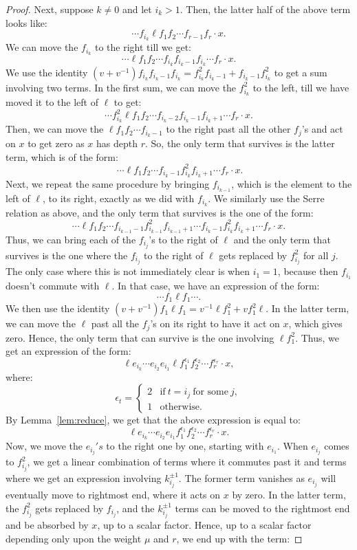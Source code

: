 \documentclass{amsart}
\numberwithin{equation}{section}
\theoremstyle{theorem}
\theoremstyle{definition}
\newcommand{\eps}{\epsilon}
\begin{document}
\begin{proof}
Next, suppose $k\neq 0$ and let $i_k>1$. Then, the latter half of the above term looks like:
\[\cdots f_{i_k} \ell  f_1 f_2\cdots f_{r-1} f_{r} \cdot x.\]
We can move the $f_{i_k}$ to the right till we get:
\[\cdots \ell  f_1 f_2\cdots f_{i_k}  f_{i_{k}-1}  f_{i_k} \cdots f_{r} \cdot x.\]
We use the identity $(v+v^{-1})f_{i_k}  f_{i_{k}-1}  f_{i_k} =f_{i_k}^2  f_{i_k - 1} + f_{i_k -1} f_{i_k}^2$ to get a sum involving two terms. In the first sum, we can move the $f_{i_k}^2$ to the left, till we have moved it to the left of $\ell$ to get:
\[\cdots f_{i_k}^2  \ell  f_1 f_2\cdots f_{i_k-2}  f_{i_{k}-1}  f_{i_k+1} \cdots f_{r} \cdot x.\]
Then, we can move the $\ell  f_1 f_2\cdots f_{i_{k}-1}$ to the right past all the other $f_j$'s and act on $x$ to get zero as $x$ has depth $r$. So, the only term that survives is the latter term, which is of the form:
\[\ \cdots \ell  f_1 f_2\cdots f_{i_k-1}  f_{i_{k}}^2  f_{i_k+1} \cdots f_{r} \cdot x.\]
Next, we repeat the same procedure by bringing $f_{i_{k-1}}$, which is the element to the left of $\ell$, to its right, exactly as we did with $f_{i_k}$. We similarly use the Serre relation as above, and the only term that survives is the one of the form:
\[\cdots \ell  f_1 f_2\cdots f_{i_{k-1}-1}  f_{i_{k-1}}^2  f_{i_{k-1}+1}\cdots f_{i_k-1}  f_{i_{k}}^2  f_{i_k+1} \cdots f_{r} \cdot x.\]
Thus, we can bring each of the $f_{i_j}$'s to the right of $\ell$ and the only term that survives is the one where the $f_{i_j}$ to the right of $\ell$ gets replaced by $f_{i_j}^2$ for all $j$. The only case where this is not immediately clear is when $i_1=1$, because then $f_{i_1}$ doesn't commute with $\ell$. In that case, we have an expression of the form:
\[\cdots f_1 \ell  f_1 \cdots.\]
We then use the identity $(v+v^{-1})f_1 \ell  f_1 = v^{-1}\ell f_1^2 + vf_1^2 \ell$. In the latter term, we can move the $\ell$ past all the $f_j$'s on its right to have it act on $x$, which gives zero. Hence, the only term that can survive is the one involving $\ell f_1^2$. Thus, we get an expression of the form:
\[\ell e_{i_k}\cdots e_{i_2} e_{i_1}  \ell  f_1^{\eps_1}  f_2^{\eps_2} \cdots f_r^{\eps_r} \cdot x,\]
where:
\[\eps_t=\begin{cases}2 & \text{if}~t=i_j~\text{for some}~j,\\1 &\text{otherwise}.\end{cases}\]
By Lemma~\ref{lem:reduce}, we get that the above expression is equal to:
\[\ell e_{i_k}\cdots e_{i_2} e_{i_1}  f_1^{\eps_1}  f_2^{\eps_2} \cdots f_r^{\eps_r} \cdot x.\]
Now, we move the $e_{i_j}'s$ to the right one by one, starting with $e_{i_1}$. When $e_{i_j}$ comes to $f_{i_j}^2$, we get a linear combination of terms where it commutes past it and terms where we get an expression involving $k_{i_j}^{\pm 1}$. The former term vanishes as $e_{i_j}$ will eventually move to rightmost end, where it acts on $x$ by zero. In the latter term, the $f_{i_j}^2$ gets replaced by $f_{i_j}$, and the $k_{i_j}^{\pm1}$ terms can be moved to the rightmost end and be absorbed by $x$, up to a scalar factor. Hence, up to a scalar factor depending only upon the weight $\mu$ and $r$, we end up with the term:

\end{proof}
\end{document}
